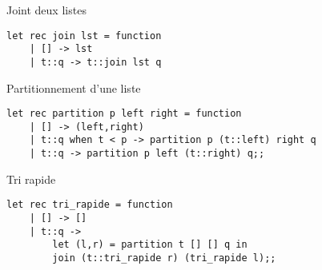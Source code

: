 \begin{imp*}{Joint deux listes}
\begin{verbatim}
let rec join lst = function
    | [] -> lst
    | t::q -> t::join lst q
\end{verbatim}
\end{imp*}
\begin{imp*}{Partitionnement d'une liste}
\begin{verbatim}
let rec partition p left right = function
    | [] -> (left,right)
    | t::q when t < p -> partition p (t::left) right q
    | t::q -> partition p left (t::right) q;;
\end{verbatim}
\end{imp*}
\begin{imp*}{Tri rapide}
\begin{verbatim}
let rec tri_rapide = function
    | [] -> []
    | t::q ->
        let (l,r) = partition t [] [] q in
        join (t::tri_rapide r) (tri_rapide l);;
\end{verbatim}
\end{imp*}